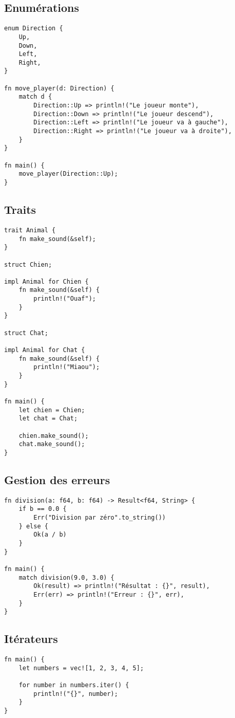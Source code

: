 \documentclass{article}
\begin{document}
\subsection{Enumérations}
\begin{lstlisting}[]
enum Direction {
    Up,
    Down,
    Left,
    Right,
}

fn move_player(d: Direction) {
    match d {
        Direction::Up => println!("Le joueur monte"),
        Direction::Down => println!("Le joueur descend"),
        Direction::Left => println!("Le joueur va à gauche"),
        Direction::Right => println!("Le joueur va à droite"),
    }
}

fn main() {
    move_player(Direction::Up);
}
\end{lstlisting}

\subsection{Traits}
\begin{lstlisting}[]
trait Animal {
    fn make_sound(&self);
}

struct Chien;

impl Animal for Chien {
    fn make_sound(&self) {
        println!("Ouaf");
    }
}

struct Chat;

impl Animal for Chat {
    fn make_sound(&self) {
        println!("Miaou");
    }
}

fn main() {
    let chien = Chien;
    let chat = Chat;

    chien.make_sound();
    chat.make_sound();
}
\end{lstlisting}

\subsection{Gestion des erreurs}
\begin{lstlisting}[]
fn division(a: f64, b: f64) -> Result<f64, String> {
    if b == 0.0 {
        Err("Division par zéro".to_string())
    } else {
        Ok(a / b)
    }
}

fn main() {
    match division(9.0, 3.0) {
        Ok(result) => println!("Résultat : {}", result),
        Err(err) => println!("Erreur : {}", err),
    }
}
\end{lstlisting}

\subsection{Itérateurs}
\begin{lstlisting}[]
fn main() {
    let numbers = vec![1, 2, 3, 4, 5];

    for number in numbers.iter() {
        println!("{}", number);
    }
}
\end{lstlisting}
\end{document}
